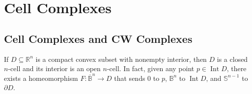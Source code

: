 \chapter{Cell Complexes}

\section{Cell Complexes and CW Complexes}

\begin{prop}{5.1}\label{prop:5.1}
	If $D\subseteq \mathbb{R}^{n}$ is a compact convex subset with nonempty interior, then $D$ is a closed $n$-cell and its interior is an open $n$-cell. In fact, given any point $p \in \operatorname{Int}D$, there exists a homeomorphism $F: \overline{\mathbb{B}}^{n} \to D$ that sends 0 to $p$, $\mathbb{B}^{n}$ to $\operatorname{Int}D$, and $\mathbb{S}^{n-1}$ to $\partial D$.
\end{prop}


